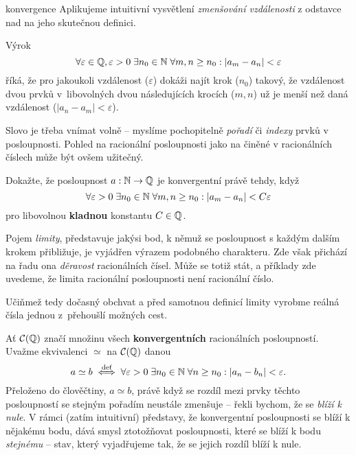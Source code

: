 \begin{remark}{}{konvergence}
 Aplikujeme intuitivní vysvětlení \emph{zmenšování vzdálenosti} z odstavce nad
  na jeho skutečnou definici.

 Výrok
 \[
  \forall \varepsilon \in \mathbb{Q}, \varepsilon>0 \; \exists n_0 \in \mathbb{N} \; \forall m,n
  \geq n_0: |a_m - a_n| < \varepsilon
 \]
 říká, že pro jakoukoli vzdálenost ($\varepsilon$) dokáži najít krok ($n_0$)
 takový, že vzdálenost dvou prvků v~libovolných dvou následujících krocích
 ($m,n$) už je menší než daná vzdálenost ($|a_n -a_m|<\varepsilon$).

 Slovo  je třeba vnímat volně -- myslíme pochopitelně \emph{pořadí} či
 \emph{indexy} prvků v posloupnosti. Pohled na racionální posloupnosti jako na
  činěné v racionálních číslech může být ovšem užitečný.
\end{remark}

\begin{exercise}{}{}
 Dokažte, že posloupnost $a:\mathbb{N} \to \mathbb{Q}$ je konvergentní právě tehdy, když
 \[
  \forall \varepsilon>0 \; \exists n_0 \in \mathbb{N} \; \forall m,n \geq n_0: |a_m -
  a_n| < C\varepsilon
 \]
 pro libovolnou \textbf{kladnou} konstantu $C \in \mathbb{Q}$.
\end{exercise}

Pojem \emph{limity}, představuje jakýsi bod, k němuž se posloupnost s každým
dalším krokem přibližuje, je vyjádřen výrazem podobného charakteru. Zde však
přichází na řadu ona \emph{děravost} racionálních čísel. Může se totiž stát, a
příklady zde uvedeme, že limita racionální posloupnosti není racionální číslo.

Učiňmež tedy dočasný obchvat a před samotnou definicí limity vyrobme reálná
čísla jednou z~přehoušlí možných cest.

Ať $\mathcal{C}(\mathbb{Q})$ značí množinu všech \textbf{konvergentních} racionálních
posloupností. Uvažme ekvivalenci $ \simeq $ na $\mathcal{C}(\mathbb{Q})$ danou
\[
 a \simeq b \overset{\text{def}}{\iff} \forall \varepsilon>0 \; \exists n_0 \in \mathbb{N}
 \; \forall n \geq n_0: |a_n - b_n| < \varepsilon.
\]
Přeloženo do člověčtiny, $a \simeq b$, právě když se rozdíl mezi prvky těchto
posloupností se stejným pořadím neustále zmenšuje -- řekli bychom, že se
\emph{blíží k nule}. V rámci (zatím intuitivní) představy, že konvergentní
posloupnosti se blíží k nějakému bodu, dává smysl ztotožňovat posloupnosti,
které se blíží k bodu \emph{stejnému} -- stav, který vyjadřujeme tak, že se
jejich rozdíl blíží k nule.

